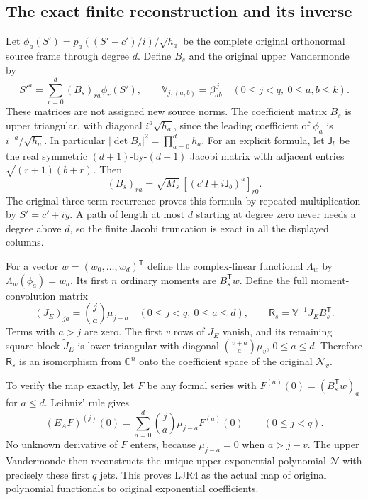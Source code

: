 \documentclass[11pt,a4paper]{article}
\begin{document}
\subsection{The exact finite reconstruction and its inverse}

Let $\phi_a(S')=p_a((S'-c')/i)/\sqrt{h_a}$ be the complete
original orthonormal source frame through degree $d$. Define
$B_s$ and the original upper Vandermonde by
\[
 S'^a=\sum_{r=0}^d(B_s)_{ra}\phi_r(S'),\qquad
 \mathbb V_{j,(a,b)}=\beta_{ab}^{\,j}
       \quad(0\le j<q,\ 0\le a,b\le k).
 \tag{LJR2}
\]
These matrices are not assigned new source norms. The coefficient
matrix $B_s$ is upper triangular, with diagonal
$i^a\sqrt{h_a}$, since the leading coefficient of $\phi_a$
is $i^{-a}/\sqrt{h_a}$. In particular
$|\det B_s|^2=\prod_{a=0}^dh_a$.
For an explicit formula, let $\mathsf J_b$ be the real symmetric
$(d+1)$-by-$(d+1)$ Jacobi matrix with adjacent entries
$\sqrt{(r+1)(b+r)}$. Then
\[
 (B_s)_{ra}=\sqrt{M_s}\,
                 [(c'I+i\mathsf J_b)^a]_{r0}.
 \tag{LJR3}
\]
The original three-term recurrence proves this formula by repeated
multiplication by $S'=c'+iy$. A path of length at most $d$
starting at degree zero never needs a degree above $d$, so the
finite Jacobi truncation is exact in all the displayed columns.

For a vector $w=(w_0,\ldots,w_d)^{\mathsf T}$ define the
complex-linear functional $\Lambda_w$ by
$\Lambda_w(\phi_a)=w_a$. Its first $n$ ordinary moments are
$B_s^{\mathsf T}w$. Define the full moment-convolution matrix
\[
 (J_E)_{ja}=\binom ja\mu_{j-a}
       \quad(0\le j<q,\ 0\le a\le d),\qquad
 \mathsf R_s=\mathbb V^{-1}J_E B_s^{\mathsf T}.
 \tag{LJR4}
\]
Terms with $a>j$ are zero. The first $v$ rows of $J_E$ vanish,
and its remaining square block $\widetilde J_E$ is lower triangular
with diagonal $\binom{v+a}{a}\mu_v$, $0\le a\le d$.
Therefore $\mathsf R_s$ is an isomorphism from $\mathbb C^n$
onto the coefficient space of the original $\mathscr N_v$.

To verify the map exactly, let $F$ be any formal series with
$F^{(a)}(0)=(B_s^{\mathsf T}w)_a$ for $a\le d$.
Leibniz' rule gives
\[
 (E_AF)^{(j)}(0)
 =\sum_{a=0}^{d}\binom ja\mu_{j-a}F^{(a)}(0)
 \qquad(0\le j<q).
 \tag{LJR5}
\]
No unknown derivative of $F$ enters, because $\mu_{j-a}=0$
when $a>j-v$. The upper Vandermonde then reconstructs the
unique upper exponential polynomial $\mathcal N$ with precisely
these first $q$ jets. This proves LJR4 as the actual map of
original polynomial functionals to original exponential coefficients.
\end{document}

